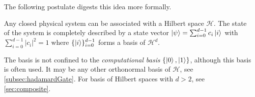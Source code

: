 		The following postulate digests this idea more formally.

		\begin{postulate}
			Any closed physical system can be associated with a Hilbert space \(\mathcal{H}\). The state of the system is completely described by a state vector \( \ket{\psi} = \sum_{i = 0}^{d - 1} c_i \ket{i} \) with \( \sum_{i = 0}^{d - 1} \lvert c_i \rvert^2 = 1 \) where \( \{ \ket{i} \}_{i = 0}^{d - 1} \) forms a basis of \( \mathcal{H}^d \).
		\end{postulate}
		\begin{remark}
			The basis is not confined to the \emph{computational basis} \( \{ \ket{0}, \ket{1} \} \), although this basis is often used. It may be any other orthonormal basis of \(\mathcal{H}\), see \autoref{subsec:hadamardGate}. For basis of Hilbert spaces with \(d > 2\), see \autoref{sec:composite}.
		\end{remark}

